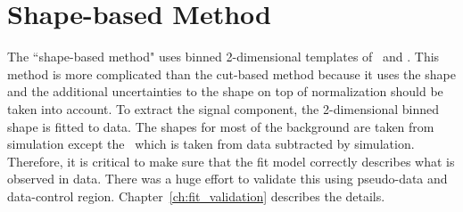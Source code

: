 





\section{Shape-based Method}
\label{sec:shape}

The ``shape-based method" uses binned 2-dimensional templates of \mT\ and \mll. 
This method is more complicated than the cut-based method
because it uses the shape and the additional uncertainties to the shape 
on top of normalization should be taken into account. 
To extract the signal component, the 2-dimensional binned shape is fitted to data. 
The shapes for most of the background are taken from simulation except 
the \Wjets\ which is taken from data subtracted by simulation. 
Therefore, it is critical to make sure that the fit model correctly describes 
what is observed in data. There was a huge effort to validate this using 
pseudo-data and data-control region. Chapter~\ref{ch:fit_validation} describes 
the details. 

